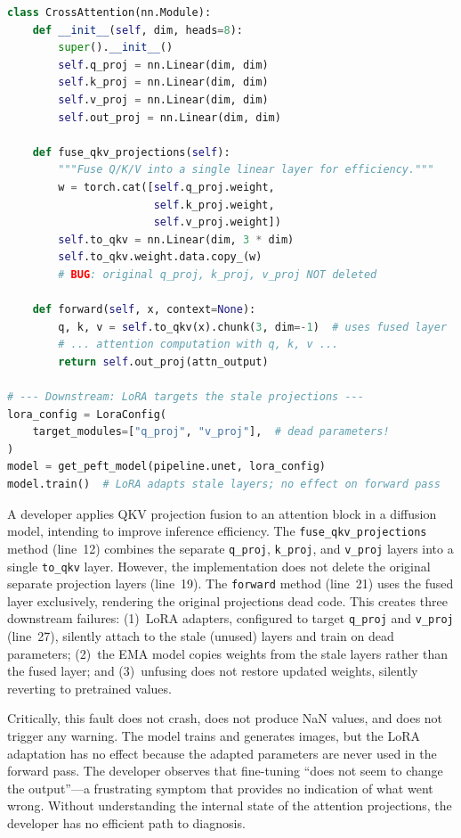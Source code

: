\begin{lstlisting}[style=github,language=Python,
  caption={A faulty QKV projection fusion in a diffusion model attention module (simplified from HuggingFace Diffusers Issue \#11903).},
  label={lst:qkv_fusion_bug}]
class CrossAttention(nn.Module):
    def __init__(self, dim, heads=8):
        super().__init__()
        self.q_proj = nn.Linear(dim, dim)
        self.k_proj = nn.Linear(dim, dim)
        self.v_proj = nn.Linear(dim, dim)
        self.out_proj = nn.Linear(dim, dim)

    def fuse_qkv_projections(self):
        """Fuse Q/K/V into a single linear layer for efficiency."""
        w = torch.cat([self.q_proj.weight,
                       self.k_proj.weight,
                       self.v_proj.weight])
        self.to_qkv = nn.Linear(dim, 3 * dim)
        self.to_qkv.weight.data.copy_(w)
        # BUG: original q_proj, k_proj, v_proj NOT deleted

    def forward(self, x, context=None):
        q, k, v = self.to_qkv(x).chunk(3, dim=-1)  # uses fused layer
        # ... attention computation with q, k, v ...
        return self.out_proj(attn_output)

# --- Downstream: LoRA targets the stale projections ---
lora_config = LoraConfig(
    target_modules=["q_proj", "v_proj"],  # dead parameters!
)
model = get_peft_model(pipeline.unet, lora_config)
model.train()  # LoRA adapts stale layers; no effect on forward pass
\end{lstlisting}

A developer applies QKV projection fusion to an attention block in a diffusion model, intending to improve inference efficiency. The \texttt{fuse\_qkv\_projections} method (line~12) combines the separate \texttt{q\_proj}, \texttt{k\_proj}, and \texttt{v\_proj} layers into a single \texttt{to\_qkv} layer. However, the implementation does not delete the original separate projection layers (line~19). The \texttt{forward} method (line~21) uses the fused layer exclusively, rendering the original projections dead code. This creates three downstream failures: (1)~LoRA adapters, configured to target \texttt{q\_proj} and \texttt{v\_proj} (line~27), silently attach to the stale (unused) layers and train on dead parameters; (2)~the EMA model copies weights from the stale layers rather than the fused layer; and (3)~unfusing does not restore updated weights, silently reverting to pretrained values.

Critically, this fault does not crash, does not produce NaN values, and does not trigger any warning. The model trains and generates images, but the LoRA adaptation has no effect because the adapted parameters are never used in the forward pass. The developer observes that fine-tuning ``does not seem to change the output''---a frustrating symptom that provides no indication of what went wrong. Without understanding the internal state of the attention projections, the developer has no efficient path to diagnosis.

